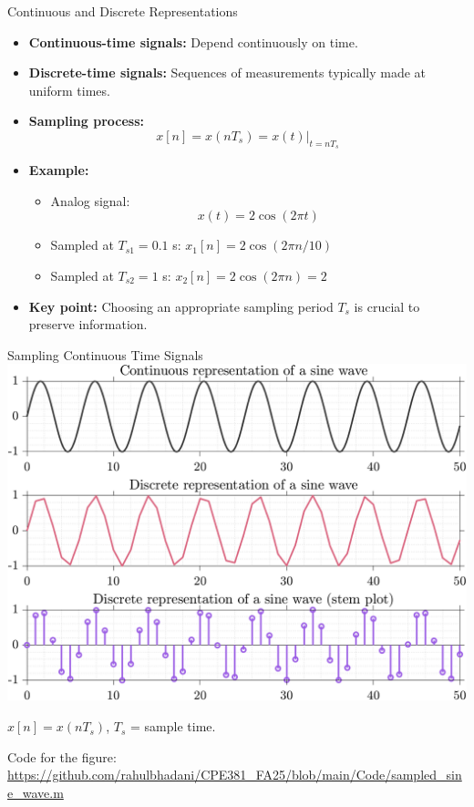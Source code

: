 \documentclass[aspectratio=169,xcolor=dvipsnames,svgnames,x11names,fleqn]{beamer}
\begin{document}
\begin{frame}{Continuous and Discrete Representations}
    \begin{itemize}
        \item \textbf{Continuous-time signals:} Depend continuously on time.
        \item \textbf{Discrete-time signals:} Sequences of measurements typically made at uniform times.
        \item \textbf{Sampling process:} 
        \begin{equation*}
            x[n] = x(nT_s) = x(t)|_{t=nT_s}
        \end{equation*}
        \item \textbf{Example:} 
        \begin{itemize}
            \item Analog signal: $$ x(t) = 2 \cos(2\pi t) $$
            \item Sampled at $ T_{s1} = 0.1 $ s: $ x_1[n] = 2 \cos(2\pi n/10) $
            \item Sampled at $ T_{s2} = 1 $ s: $ x_2[n] = 2 \cos(2\pi n) = 2 $
        \end{itemize}
        \item \textbf{Key point:} Choosing an appropriate sampling period \( T_s \) is crucial to preserve information.
    \end{itemize}
\end{frame}
\begin{frame}{Sampling Continuous Time Signals}
    \centering
    \includegraphics[width=0.45\linewidth, trim=0 0 0 0cm,clip]{figures/sampled_sine_wave.png} 
    
    $x[n] = x(nT_s)$,
$T_s$ = sample time.
    
    \tiny
    Code for the figure: \url{https://github.com/rahulbhadani/CPE381_FA25/blob/main/Code/sampled_sine_wave.m}
\end{frame}
\end{document}
